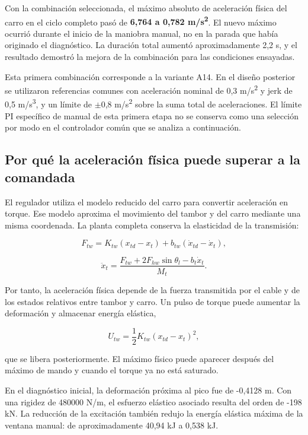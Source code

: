 \documentclass[a4paper,10pt,onecolumn,journal]{ieeeconf}
\numberwithin{equation}{section}
\begin{document}
Con la combinación seleccionada, el máximo absoluto de aceleración física del carro en el ciclo completo pasó de \textbf{6,764 a 0,782 m/s\textsuperscript{2}}. El nuevo máximo ocurrió durante el inicio de la maniobra manual, no en la parada que había originado el diagnóstico. La duración total aumentó aproximadamente 2,2 s, y el resultado demostró la mejora de la combinación para las condiciones ensayadas.


Esta primera combinación corresponde a la variante A14. En el diseño posterior se utilizaron referencias comunes con aceleración nominal de 0,3 m/s\textsuperscript{2} y jerk de 0,5 m/s\textsuperscript{3}, y un límite de \(\pm\)0,8 m/s\textsuperscript{2} sobre la suma total de aceleraciones. El límite PI específico de manual de esta primera etapa no se conserva como una selección por modo en el controlador común que se analiza a continuación.


\subsection{Por qué la aceleración física puede superar a la comandada}
El regulador utiliza el modelo reducido del carro para convertir aceleración en torque. Ese modelo aproxima el movimiento del tambor y del carro mediante una misma coordenada. La planta completa conserva la elasticidad de la transmisión:

\begin{equation}
F_{tw}=K_{tw}(x_{td}-x_t)+b_{tw}(\dot x_{td}-\dot x_t),
\end{equation}

\begin{equation}
\ddot x_t=\frac{F_{tw}+2F_{hw}\sin\theta_l-b_t\dot x_t}{M_t}.
\end{equation}

Por tanto, la aceleración física depende de la fuerza transmitida por el cable y de los estados relativos entre tambor y carro. Un pulso de torque puede aumentar la deformación y almacenar energía elástica,

\begin{equation}
U_{tw}=\frac12 K_{tw}(x_{td}-x_t)^2,
\end{equation}

que se libera posteriormente. El máximo físico puede aparecer después del máximo de mando y cuando el torque ya no está saturado.

En el diagnóstico inicial, la deformación próxima al pico fue de -0,4128 m. Con una rigidez de 480000 N/m, el esfuerzo elástico asociado resulta del orden de -198 kN. La reducción de la excitación también redujo la energía elástica máxima de la ventana manual: de aproximadamente 40,94 kJ a 0,538 kJ.
\end{document}
